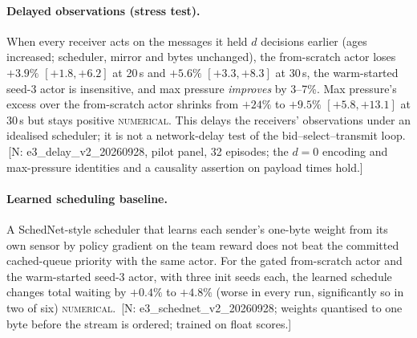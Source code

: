 \documentclass[11pt]{article}
\theoremstyle{definition}
\newcommand{\NUM}{\textsc{numerical}}
\newif\ifshownotes\shownotestrue
\newcommand{\NOTE}[1]{\ifshownotes{\color{notecol}\,\textsf{\footnotesize[N: #1]}}\fi}
\begin{document}
\paragraph{Delayed observations (stress test).} When every receiver acts on the messages it held $d$
decisions earlier (ages increased; scheduler, mirror and bytes unchanged), the from-scratch actor loses
$+3.9\%$ $[+1.8,+6.2]$ at 20\,s and $+5.6\%$ $[+3.3,+8.3]$ at 30\,s, the warm-started seed-3 actor is
insensitive, and max pressure \emph{improves} by 3--7\%. Max pressure's excess over the from-scratch actor
shrinks from $+24\%$ to $+9.5\%$ $[+5.8,+13.1]$ at 30\,s but stays positive \NUM. This delays the
receivers' observations under an idealised scheduler; it is not a network-delay test of the
bid--select--transmit loop. \NOTE{e3\_delay\_v2\_20260928, pilot panel, 32 episodes; the $d=0$ encoding
and max-pressure identities and a causality assertion on payload times hold.}

\paragraph{Learned scheduling baseline.} A SchedNet-style scheduler that learns each sender's one-byte
weight from its own sensor by policy gradient on the team reward does not beat the committed
cached-queue priority with the same actor. For the gated from-scratch actor and the warm-started seed-3
actor, with three init seeds each, the learned schedule changes total waiting by $+0.4\%$ to $+4.8\%$
(worse in every run, significantly so in two of six) \NUM. \NOTE{e3\_schednet\_v2\_20260928; weights
quantised to one byte before the stream is ordered; trained on float scores.}
\end{document}
